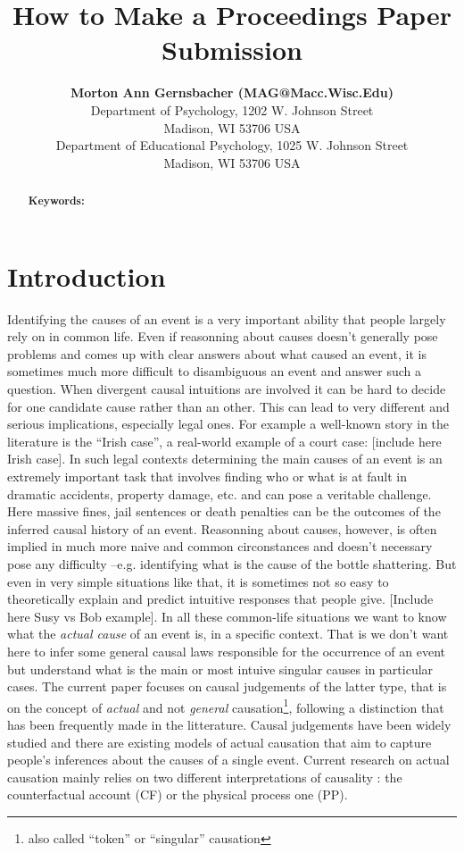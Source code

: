 \documentclass[10pt,letterpaper]{article}
\title{How to Make a Proceedings Paper Submission}
\author{{\large \bf Morton Ann Gernsbacher (MAG@Macc.Wisc.Edu)} \\
  Department of Psychology, 1202 W. Johnson Street \\
  Madison, WI 53706 USA
  \AND {\large \bf Sharon J.~Derry (SDJ@Macc.Wisc.Edu)} \\
  Department of Educational Psychology, 1025 W. Johnson Street \\
  Madison, WI 53706 USA}
\begin{document}
\maketitle


\begin{abstract}

\textbf{Keywords:} 
\end{abstract}


\section{Introduction}

Identifying the causes of an event is a very important ability that people largely rely on in common life. Even if reasonning about causes doesn't generally pose problems and comes up with clear answers about what caused an event, it is sometimes much more difficult to disambiguous an event and answer such a question. When divergent causal intuitions are involved it can be hard to decide for one candidate cause rather than an other. This can lead to very different and serious implications, especially legal ones. For example a well-known story in the literature is the ``Irish case'', a real-world example of a court case: [include here Irish case]. In such legal contexts determining the main causes of an event is an extremely important task that involves finding who or what is at fault in dramatic accidents, property damage, etc. and can pose a veritable challenge. Here massive fines, jail sentences or death penalties can be the outcomes of the inferred causal history of an event. Reasonning about causes, however, is often implied in much more naive and common circonstances and doesn't necessary pose any difficulty --e.g. identifying what is the cause of the bottle shattering. But even in very simple situations like that, it is sometimes not so easy to theoretically explain and predict intuitive responses that people give. [Include here Susy vs Bob example]. In all these common-life situations we want to know what the \textit{actual cause} of an event is, in a specific context. That is we don't want here to infer some general causal laws responsible for the occurrence of an event but understand what is the main or most intuive singular causes in particular cases. The current paper focuses on causal judgements of the latter type, that is on the concept of \textit{actual} and not \textit{general} causation\footnote{also called ``token'' or ``singular'' causation}, following a distinction that has been frequently made in the litterature. Causal judgements have been widely studied and there are existing models of actual causation that aim to capture people's inferences about the causes of a single event. Current research on actual causation mainly relies on two different interpretations of causality : the counterfactual account (CF) or the physical process one (PP).
\end{document}
